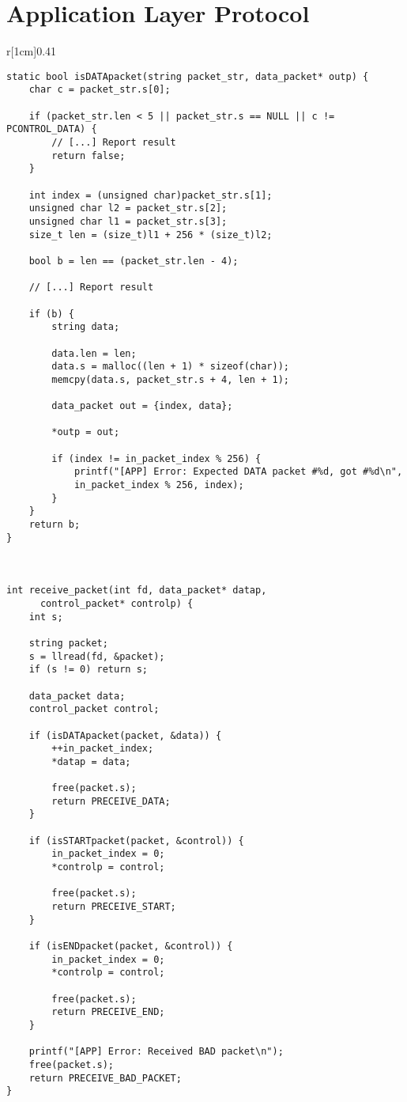 \documentclass[main.tex]{subfiles}
\begin{document}
\section{Application Layer Protocol}

\begin{wrapfigure}[38]{r}[1cm]{0.41\textwidth}
\begin{lstlisting}[style=rcom]
static bool isDATApacket(string packet_str, data_packet* outp) {
	char c = packet_str.s[0];
	
	if (packet_str.len < 5 || packet_str.s == NULL || c != PCONTROL_DATA) {
		// [...] Report result
		return false;
	}
	
	int index = (unsigned char)packet_str.s[1];
	unsigned char l2 = packet_str.s[2];
	unsigned char l1 = packet_str.s[3];
	size_t len = (size_t)l1 + 256 * (size_t)l2;
	
	bool b = len == (packet_str.len - 4);
	
	// [...] Report result
	
	if (b) {
		string data;
		
		data.len = len;
		data.s = malloc((len + 1) * sizeof(char));
		memcpy(data.s, packet_str.s + 4, len + 1);
		
		data_packet out = {index, data};
		
		*outp = out;
		
		if (index != in_packet_index % 256) {
			printf("[APP] Error: Expected DATA packet #%d, got #%d\n",
			in_packet_index % 256, index);
		}
	}
	return b;
}



int receive_packet(int fd, data_packet* datap,
	  control_packet* controlp) {
	int s;
	
	string packet;
	s = llread(fd, &packet);
	if (s != 0) return s;
	
	data_packet data;
	control_packet control;
	
	if (isDATApacket(packet, &data)) {
		++in_packet_index;
		*datap = data;
		
		free(packet.s);
		return PRECEIVE_DATA;
	}
	
	if (isSTARTpacket(packet, &control)) {
		in_packet_index = 0;
		*controlp = control;
		
		free(packet.s);
		return PRECEIVE_START;
	}
	
	if (isENDpacket(packet, &control)) {
		in_packet_index = 0;
		*controlp = control;
		
		free(packet.s);
		return PRECEIVE_END;
	}
	
	printf("[APP] Error: Received BAD packet\n");
	free(packet.s);
	return PRECEIVE_BAD_PACKET;
}
\end{lstlisting}
\end{wrapfigure}
\end{document}
